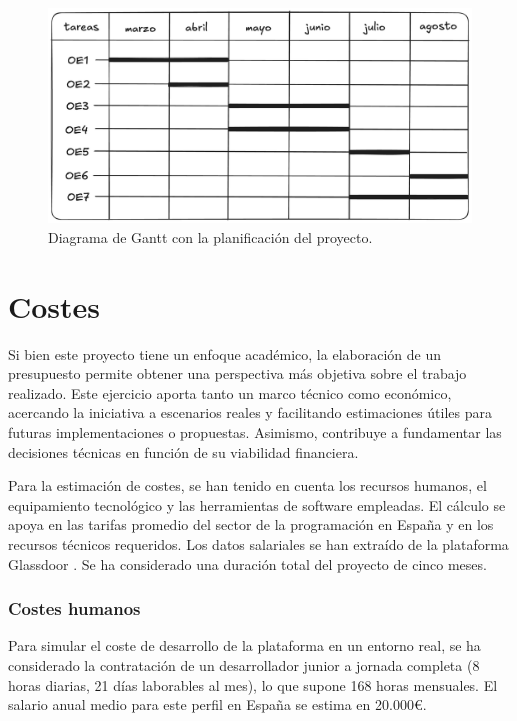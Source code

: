 \begin{figure}[H]
    \centering
    \includegraphics[width=\textwidth]{imagenes/gantt1.png}
    \caption{Diagrama de Gantt con la planificación del proyecto.}
\end{figure}

\section{Costes}

Si bien este proyecto tiene un enfoque académico, la elaboración de un presupuesto permite obtener una perspectiva más objetiva sobre el trabajo realizado. Este ejercicio aporta tanto un marco técnico como económico, acercando la iniciativa a escenarios reales y facilitando estimaciones útiles para futuras implementaciones o propuestas. Asimismo, contribuye a fundamentar las decisiones técnicas en función de su viabilidad financiera.

Para la estimación de costes, se han tenido en cuenta los recursos humanos, el equipamiento tecnológico y las herramientas de software empleadas. El cálculo se apoya en las tarifas promedio del sector de la programación en España y en los recursos técnicos requeridos. Los datos salariales se han extraído de la plataforma Glassdoor \cite{glassdoor}. Se ha considerado una duración total del proyecto de cinco meses.

\subsubsection{Costes humanos}

Para simular el coste de desarrollo de la plataforma en un entorno real, se ha considerado la contratación de un desarrollador junior a jornada completa (8 horas diarias, 21 días laborables al mes), lo que supone 168 horas mensuales. El salario anual medio para este perfil en España se estima en 20.000€.

